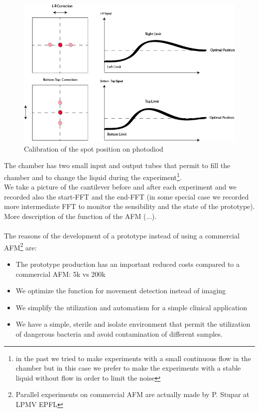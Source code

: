 \documentclass[11pt, a4paper]{article}
\begin{document}
\begin{figure}[h] 
\centering
		\includegraphics[width=0.6\linewidth]{FFT/Spot_position2.jpg} 
\caption{Calibration of the spot position on photodiod} 
\end{figure}%

The chamber has two small input and output tubes that permit to fill the chamber and to change the liquid during the experiment\footnote{in the past we tried to make experiments with a small continuous flow in the chamber but in this case we prefer to make the experiments with a stable liquid without flow in order to limit the noise}. \\
We take a picture of the cantilever before and after each experiment and we recorded also the start-FFT and the end-FFT (in some special case we recorded more intermediate FFT to monitor the sensibility and the state of the prototype).
More description of the function of the AFM (...).
\\
\\
The reasons of the development of a prototype instead of using a commercial AFM\footnote{Parallel experiments on commercial AFM are actually made by P. Stupar at LPMV EPFL} are:
\begin{itemize}
\item The prototype production has an important reduced costs compared to a commercial AFM: 5k vs 200k
\item We optimize the function for movement detection instead of imaging 
\item We simplify the utilization and automatism for a simple clinical application 
\item We have a simple, sterile and isolate environment that permit the utilization of dangerous bacteria and avoid contamination of different samples.
\end{itemize}
\end{document}
